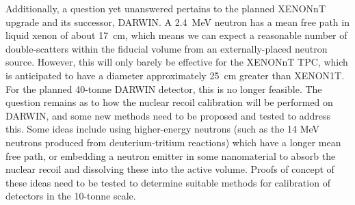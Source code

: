 \documentclass[phys,dissertation]{puthesis}
\begin{document}
Additionally, a question yet unanswered pertains to the planned XENONnT upgrade and its successor, DARWIN. A 2.4~MeV neutron has a mean free path in liquid xenon of about 17~cm, which means we can expect a reasonable number of double-scatters within the fiducial volume from an externally-placed neutron source. However, this will only barely be effective for the XENONnT TPC, which is anticipated to have a diameter approximately 25~cm greater than XENON1T. For the planned 40-tonne DARWIN detector, this is no longer feasible. The question remains as to how the nuclear recoil calibration will be performed on DARWIN, and some new methods need to be proposed and tested to address this. Some ideas include using higher-energy neutrons (such as the 14 MeV neutrons produced from deuterium-tritium reactions) which have a longer mean free path, or embedding a neutron emitter in some nanomaterial to absorb the nuclear recoil and dissolving these into the active volume. Proofs of concept of these ideas need to be tested to determine suitable methods for calibration of detectors in the 10-tonne scale.



\end{document}
